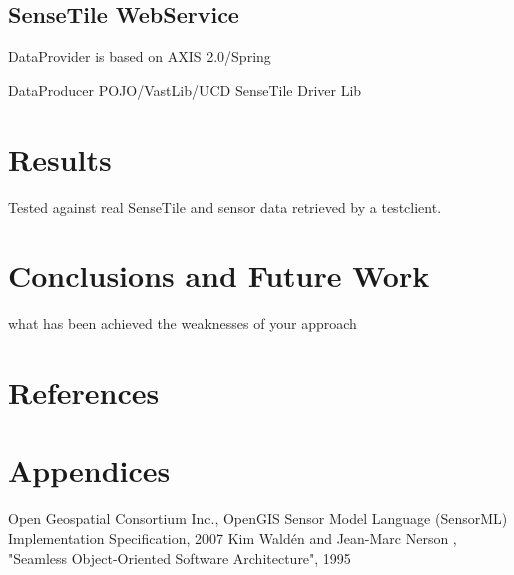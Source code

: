 \documentclass[]{final_report}
\begin{document}
\section{SenseTile WebService}

DataProvider is based on AXIS 2.0/Spring

DataProducer POJO/VastLib/UCD SenseTile Driver Lib

\chapter{Results}

Tested against real SenseTile and sensor data retrieved by a testclient.


\chapter{ Conclusions and Future Work}

what has been achieved
the weaknesses of your approach

\chapter{References}



\chapter{Appendices}


\newpage
\begin{thebibliography}{99}
Open Geospatial Consortium Inc., OpenGIS Sensor Model Language (SensorML) Implementation Specification, 2007
Kim Waldén and Jean-Marc Nerson , "Seamless Object-Oriented Software Architecture", 1995
\end{thebibliography}
\label{endpage}
\end{document}
